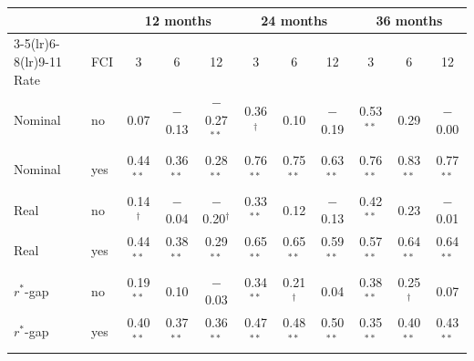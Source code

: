 \begin{tabular}{llccccccccc}
\toprule
 & & \multicolumn{3}{c}{12 months} & \multicolumn{3}{c}{24 months} & \multicolumn{3}{c}{36 months}\\
\cmidrule(lr){3-5}\cmidrule(lr){6-8}\cmidrule(lr){9-11}
Rate & FCI & 3 & 6 & 12 & 3 & 6 & 12 & 3 & 6 & 12 \\
\midrule
Nominal & no & 0.07 & $-$0.13 & $-$0.27$^{**}$ & 0.36$^{\dagger}$ & 0.10 & $-$0.19 & 0.53$^{**}$ & 0.29 & $-$0.00 \\
Nominal & yes & 0.44$^{**}$ & 0.36$^{**}$ & 0.28$^{**}$ & 0.76$^{**}$ & 0.75$^{**}$ & 0.63$^{**}$ & 0.76$^{**}$ & 0.83$^{**}$ & 0.77$^{**}$ \\
\midrule
Real & no & 0.14$^{\dagger}$ & $-$0.04 & $-$0.20$^{\dagger}$ & 0.33$^{**}$ & 0.12 & $-$0.13 & 0.42$^{**}$ & 0.23 & $-$0.01 \\
Real & yes & 0.44$^{**}$ & 0.38$^{**}$ & 0.29$^{**}$ & 0.65$^{**}$ & 0.65$^{**}$ & 0.59$^{**}$ & 0.57$^{**}$ & 0.64$^{**}$ & 0.64$^{**}$ \\
\midrule
$r^*$-gap & no & 0.19$^{**}$ & 0.10 & $-$0.03 & 0.34$^{**}$ & 0.21$^{\dagger}$ & 0.04 & 0.38$^{**}$ & 0.25$^{\dagger}$ & 0.07 \\
$r^*$-gap & yes & 0.40$^{**}$ & 0.37$^{**}$ & 0.36$^{**}$ & 0.47$^{**}$ & 0.48$^{**}$ & 0.50$^{**}$ & 0.35$^{**}$ & 0.40$^{**}$ & 0.43$^{**}$ \\
\bottomrule
\end{tabular}

